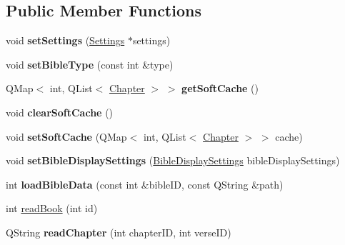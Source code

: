 \subsection*{Public Member Functions}
\begin{DoxyCompactItemize}
\item 
\hypertarget{classBible_abbc3f50a8babc5b981463f43a526623f}{
void {\bfseries setSettings} (\hyperlink{classSettings}{Settings} $\ast$settings)}
\label{classBible_abbc3f50a8babc5b981463f43a526623f}

\item 
\hypertarget{classBible_a5d888a9ecb7988783596ba6af64b4c32}{
void {\bfseries setBibleType} (const int \&type)}
\label{classBible_a5d888a9ecb7988783596ba6af64b4c32}

\item 
\hypertarget{classBible_a755e37d040f73db48a8cb11a76cfdd9c}{
QMap$<$ int, QList$<$ \hyperlink{structChapter}{Chapter} $>$ $>$ {\bfseries getSoftCache} ()}
\label{classBible_a755e37d040f73db48a8cb11a76cfdd9c}

\item 
\hypertarget{classBible_ae5402b0e0d92d7a34a760948eebf576f}{
void {\bfseries clearSoftCache} ()}
\label{classBible_ae5402b0e0d92d7a34a760948eebf576f}

\item 
\hypertarget{classBible_a94b020a639d4f6d36766a4f3eaa3adfa}{
void {\bfseries setSoftCache} (QMap$<$ int, QList$<$ \hyperlink{structChapter}{Chapter} $>$ $>$ cache)}
\label{classBible_a94b020a639d4f6d36766a4f3eaa3adfa}

\item 
\hypertarget{classBible_afc221da9f11ff62e49588149a08eeee6}{
void {\bfseries setBibleDisplaySettings} (\hyperlink{classBibleDisplaySettings}{BibleDisplaySettings} bibleDisplaySettings)}
\label{classBible_afc221da9f11ff62e49588149a08eeee6}

\item 
\hypertarget{classBible_a6d8d6c69442ee00dab64ef12e986d22f}{
int {\bfseries loadBibleData} (const int \&bibleID, const QString \&path)}
\label{classBible_a6d8d6c69442ee00dab64ef12e986d22f}

\item 
int \hyperlink{classBible_a0057dd2ba35fe377624da860a6959cd9}{readBook} (int id)
\item 
\hypertarget{classBible_a42e0e107fa2b5966bfa90f60a0fdc3cb}{
QString {\bfseries readChapter} (int chapterID, int verseID)}
\label{classBible_a42e0e107fa2b5966bfa90f60a0fdc3cb}


\end{DoxyCompactItemize}
